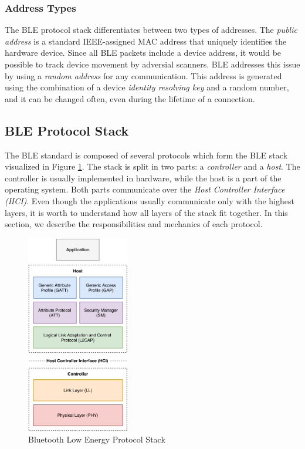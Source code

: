 \subsubsection{Address Types}

The BLE protocol stack differentiates between two types of addresses. The \textit{public address} is a standard IEEE-assigned MAC address that uniquely identifies the hardware device. Since all BLE packets include a device address, it would be possible to track device movement by adversial scanners. BLE addresses this issue by using a \textit{random address} for any communication. This address is generated using the combination of a device \textit{identity resolving key} and a random number, and it can be changed often, even during the lifetime of a connection.


\iffalse
\subsection{BLE Protocol Stack}

The BLE standard is composed of several protocols which form the BLE stack visualized in Figure \ref{ble_stack}. The stack is split in two parts: a \textit{controller} and a \textit{host}. The controller is usually implemented in hardware, while the host is a part of the operating system. Both parts communicate over the \textit{Host Controller Interface (HCI)}. Even though the applications usually communicate only with the highest layers, it is worth to understand how all layers of the stack fit together. In this section, we describe the responsibilities and mechanics of each protocol.

\begin{figure}
    \centering
    \includegraphics[width=0.40\textwidth]{diagrams/ble-stack}
    \caption{Bluetooth Low Energy Protocol Stack \cite{blebook}}
    \label{ble_stack}
\end{figure}

